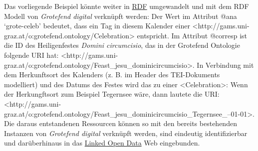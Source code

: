 \documentclass{article}
\begin{document}
        Das vorliegende Beispiel könnte weiter in \href{http://gams.uni-graz.at/o:konde.131}{RDF} umgewandelt und mit dem RDF Modell von \emph{Grotefend digital} verknüpft werden: Der Wert im Attribut
                     @ana ‘grote-celeb’ bedeutet, dass ein Tag in diesem Kalender einer
                  <http://gams.uni-graz.at/o:grotefend.ontology/Celebration> entspricht. Im
                  Attribut @corresp ist die ID des Heiligenfestes \emph{Domini
                     circumcisio}, das in der Grotefend Ontologie folgende URI hat:
                        <http://gams.uni-graz.at/o:grotefend.ontology/Feast\_jesu\_dominicircumcisio>.
                  In Verbindung mit dem Herkunftsort des Kalenders (z. B. im Header des
                  TEI-Dokuments modelliert) und des Datums des Festes wird das zu einer
                  <Celebration>: Wenn der Herkungftsort zum Beispiel Tegernsee wäre, dann
                  lautete die URI: <http://gams.uni-graz.at/o:grotefend.ontology/Feast\_jesu\_dominicircumcisio\_Tegernsee\_--01-01>.\\
            
        Die daraus entstandenen Ressourcen können so mit den bereits bestehenden Instanzen
                  von \emph{Grotefend digital} verknüpft werden, sind eindeutig
                  identifizierbar und darüberhinaus in das \href{http://gams.uni-graz.at/o:konde.8}{Linked Open Data} Web eingebunden.\\
            
\end{document}
